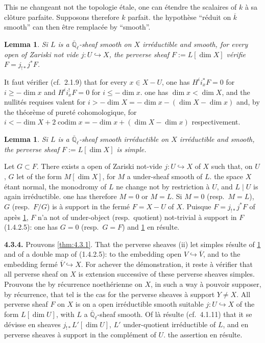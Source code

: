 \documentclass[12pt,a4paper]{article}
\theoremstyle{plain}
\newtheorem{lemma}[theorem]{Lemma}
\theoremstyle{definition}
\newcommand{\into}{\hookrightarrow}
\providecommand{\codim}{\operatorname{codim}}
\begin{document}
{{This ne changeant not the topologie \'{e}tale, one can \'{e}tendre the scalaires of $k$ \`{a} sa cl\^{o}ture parfaite. Supposons therefore $k$ parfait. the hypoth\`{e}se ``r\'{e}duit on $\overline{k}$ smooth'' can then \^{e}tre remplac\'{e}e by ``smooth''.

\begin{lemma}\label{lem:4.3.2}
Si $L$ is a $\overline{\mathbb{Q}}_{\ell}$-sheaf smooth on $X$ irr\'{e}ductible and smooth, for every open of Zariski not vide $j: U \into X$, the perverse sheaf $F := L[\dim X]$ v\'{e}rifie $F = j_{!*}j^{*}F$.
\end{lemma}

It faut v\'{e}rifier (cf.\ 2.1.9) that for every $x \in X-U$, one has $H^{i}i_{x}^{*}F = 0$ for $i \geq -\dim x$ and $H^{i}i_{x}^{!}F = 0$ for $i \leq -\dim x$. one has $\dim x < \dim X$, and the nullit\'{e}s requises valent for $i > -\dim X = -\dim x - (\dim X - \dim x)$ and, by the th\'{e}or\`{e}me of puret\'{e} cohomologique, for $i < -\dim X + 2\codim x = -\dim x + (\dim X - \dim x)$ respectivement.

\begin{lemma}\label{lem:4.3.3}
Si $L$ is a $\overline{\mathbb{Q}}_{\ell}$-sheaf smooth irr\'{e}ductible on $X$ irr\'{e}ductible and smooth, the perverse sheaf $F := L[\dim X]$ is simple.
\end{lemma}

Let $G \subset F$. There exists a open of Zariski not-vide $j: U \into X$ of $X$ such that, on $U$, $G$ let of the form $M[\dim X]$, for $M$ a under-sheaf smooth of $L$. the space $X$ \'{e}tant normal, the monodromy of $L$ ne change not by restriction \`{a} $U$, and $L \mid U$ is again irr\'{e}ductible. one has therefore $M = 0$ or $M = L$. Si $M = 0$ (resp.\ $M = L$), $G$ (resp.\ $F/G$) is \`{a} support in the ferm\'{e} $F = X-U$ of $X$. Puisque $F = j_{!*}j^{*}F$ of apr\`{e}s \ref{lem:4.3.2}, $F$ n'a not of under-object (resp.\ quotient) not-trivial \`{a} support in $F$ (1.4.2.5): one has $G = 0$ (resp.\ $G = F$) and \ref{lem:4.3.3} en r\'{e}sulte.

\noindent\textbf{4.3.4.} Prouvons \ref{thm:4.3.1}. That the perverse sheaves (ii) let simples r\'{e}sulte of \ref{lem:4.3.3} and of a double map of (1.4.2.5): to the embedding open $V \into \overline{V}$, and to the embedding ferm\'{e} $\overline{V} \into X$. For achever the d\'{e}monstration, it reste \`{a} v\'{e}rifier that all perverse sheaf on $X$ is extension successive of these perverse sheaves simples. Prouvons the by r\'{e}currence noeth\'{e}rienne on $X$, in such a way \`{a} pouvoir supposer, by r\'{e}currence, that tel is the cas for the perverse sheaves \`{a} support $Y \neq X$. All perverse sheaf $F$ on $X$ is on a open irr\'{e}ductible smooth suitable $j: U \into X$ of the form $L[\dim U]$, with $L$ a $\overline{\mathbb{Q}}_{\ell}$-sheaf smooth. Of l\`{a} r\'{e}sulte (cf.\ 4.1.11) that it se d\'{e}visse en sheaves $j_{!*}L'[\dim U]$, $L'$ under-quotient irr\'{e}ductible of $L$, and en perverse sheaves \`{a} support in the compl\'{e}ment of $U$. the assertion en r\'{e}sulte.

}}
\end{document}
